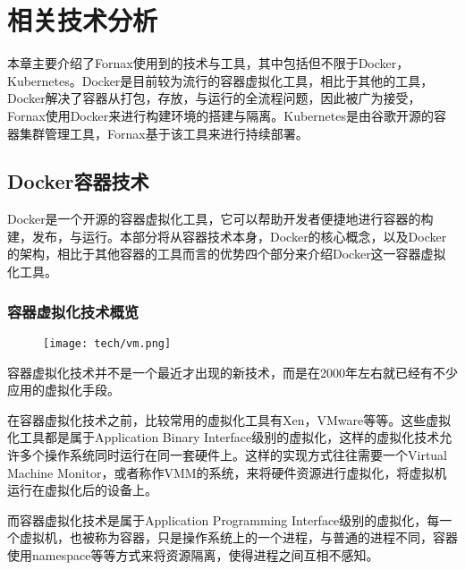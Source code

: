
\chapter{相关技术分析}
\label{chap:tech}

本章主要介绍了Fornax使用到的技术与工具，其中包括但不限于Docker，Kubernetes。Docker是目前较为流行的容器虚拟化工具，相比于其他的工具，Docker解决了容器从打包，存放，与运行的全流程问题，因此被广为接受，Fornax使用Docker来进行构建环境的搭建与隔离。Kubernetes是由谷歌开源的容器集群管理工具，Fornax基于该工具来进行持续部署。

\section{Docker容器技术}

Docker是一个开源的容器虚拟化工具，它可以帮助开发者便捷地进行容器的构建，发布，与运行。本部分将从容器技术本身，Docker的核心概念，以及Docker的架构，相比于其他容器的工具而言的优势四个部分来介绍Docker这一容器虚拟化工具。

\subsection{容器虚拟化技术概览}

\begin{figure}[!htp]
  \centering
  \texttt{[image: tech/vm.png]}
\end{figure}

容器虚拟化技术并不是一个最近才出现的新技术，而是在2000年左右就已经有不少应用的虚拟化手段。

在容器虚拟化技术之前，比较常用的虚拟化工具有Xen，VMware等等。这些虚拟化工具都是属于Application Binary Interface级别的虚拟化，这样的虚拟化技术允许多个操作系统同时运行在同一套硬件上。这样的实现方式往往需要一个Virtual Machine Monitor，或者称作VMM的系统，来将硬件资源进行虚拟化，将虚拟机运行在虚拟化后的设备上。

而容器虚拟化技术是属于Application Programming Interface级别的虚拟化，每一个虚拟机，也被称为容器，只是操作系统上的一个进程，与普通的进程不同，容器使用namespace等等方式来将资源隔离，使得进程之间互相不感知。\supercite{soltesz2007container}

